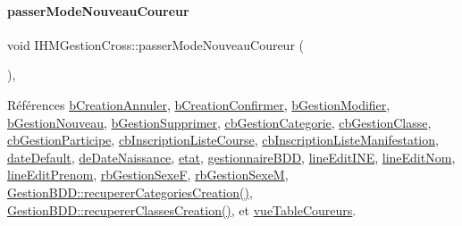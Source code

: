 \paragraph{\texorpdfstring{passer\+Mode\+Nouveau\+Coureur}{passerModeNouveauCoureur}}
{\footnotesize\ttfamily void I\+H\+M\+Gestion\+Cross\+::passer\+Mode\+Nouveau\+Coureur (\begin{DoxyParamCaption}{ }\end{DoxyParamCaption})\hspace{0.3cm}{\ttfamily [private]}, {\ttfamily [slot]}}



Références \hyperlink{class_i_h_m_gestion_cross_a297a77054dc0f54e461c0f9b0382efb3}{b\+Creation\+Annuler}, \hyperlink{class_i_h_m_gestion_cross_aac8a7363e20bc9ba2f65b7d9b3bc856e}{b\+Creation\+Confirmer}, \hyperlink{class_i_h_m_gestion_cross_a524ced9992dcc4e7ee25b01e30c4c5df}{b\+Gestion\+Modifier}, \hyperlink{class_i_h_m_gestion_cross_ab987235a79961d3d186878052a02b21b}{b\+Gestion\+Nouveau}, \hyperlink{class_i_h_m_gestion_cross_adc5bed6caf7f597dd30999bc871e695b}{b\+Gestion\+Supprimer}, \hyperlink{class_i_h_m_gestion_cross_a60cdc44c61bcd4e1e189c8de5556b89e}{cb\+Gestion\+Categorie}, \hyperlink{class_i_h_m_gestion_cross_af734c4b13942dd83fbbd0355e3728c9f}{cb\+Gestion\+Classe}, \hyperlink{class_i_h_m_gestion_cross_a89aff3b1c5d5198dd7aaecd932331e0d}{cb\+Gestion\+Participe}, \hyperlink{class_i_h_m_gestion_cross_aff44e6f1a225ee5b55783afe72049f83}{cb\+Inscription\+Liste\+Course}, \hyperlink{class_i_h_m_gestion_cross_a317ffd7cc1c9aa5d6e55c53568e44f98}{cb\+Inscription\+Liste\+Manifestation}, \hyperlink{class_i_h_m_gestion_cross_a021706ef369d2bf3b95bcb4a8ecfdbe4}{date\+Default}, \hyperlink{class_i_h_m_gestion_cross_a1c63c5c91be88aef13d2582e48dff7d0}{de\+Date\+Naissance}, \hyperlink{class_i_h_m_gestion_cross_a5da4390d71dbd5d05cff339f93c7c85a}{etat}, \hyperlink{class_i_h_m_gestion_cross_a440bac63a3e51db3e2c08e883f8cafc9}{gestionnaire\+B\+DD}, \hyperlink{class_i_h_m_gestion_cross_ab6c32fd079f81c4fa0b9ec0b4ef9bb61}{line\+Edit\+I\+NE}, \hyperlink{class_i_h_m_gestion_cross_a633102626c5dedd575b51a1ba5c6e708}{line\+Edit\+Nom}, \hyperlink{class_i_h_m_gestion_cross_a7bea7529f01cf8ca8f365d418aae52d5}{line\+Edit\+Prenom}, \hyperlink{class_i_h_m_gestion_cross_a4474ef47310eb3511befdf1beaa18b56}{rb\+Gestion\+SexeF}, \hyperlink{class_i_h_m_gestion_cross_a7d471a7f96862dcd302f7f8cc52dfea4}{rb\+Gestion\+SexeM}, \hyperlink{class_gestion_b_d_d_a76ab3e307ad9005dcdb2781fc77fc5c8}{Gestion\+B\+D\+D\+::recuperer\+Categories\+Creation()}, \hyperlink{class_gestion_b_d_d_a38d728d644f23048f1a6d3e6d4656764}{Gestion\+B\+D\+D\+::recuperer\+Classes\+Creation()}, et \hyperlink{class_i_h_m_gestion_cross_a4a0ba98c5b671a38d67942254d2329db}{vue\+Table\+Coureurs}.



